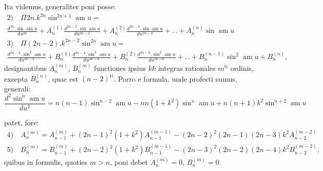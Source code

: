 \documentclass{article}
\begin{document}
Ita videmus, generaliter poni posse:
\[
\begin{gathered}
\text{2)}\quad\Pi 2n.k^{2n}\sin^{2n+1}\operatorname{am}u=\\[1.5ex]
\frac{d^{2n}.\sin\operatorname{am}u}{du^{2n}}+A_{n}^{(1)}\frac{d^{2n-2}.\sin\operatorname{am}u}{du^{2n-2}}+A_{n}^{(2)}\frac{d^{2n-4}.\sin\operatorname{am}u}{du^{2n-4}}+.\,.+A_{n}^{(n)}\sin\operatorname{am}u\\[1.5ex]
\text{3)}\quad\Pi(2n-2).k^{2n-2}\sin^{2n}\operatorname{am}u=\\[1.5ex]
\frac{d^{2n-2}.\sin^{2}\operatorname{am}u}{du^{2n-2}}+B_{n}^{(1)}\frac{d^{2n-4}.\sin^{2}\operatorname{am}u}{du^{2n-4}}+B_{n}^{(2)}\frac{d^{2n-6}.\sin^{2}\operatorname{am}u}{du^{2n-6}}+.\,.+B_{n}^{(n-1)}\sin^{2}\operatorname{am}u+B_{n}^{(n)},
\end{gathered}
\]
designantibus $A_{n}^{(m)}$, $B_{n}^{(m)}$ functiones ipsius $kk$ integras rationales $m^{\mathrm{ti}}$ ordinis, excepta $B_{n}^{(n)}$, quae est $(n-2)^{\mathrm{ti}}$. Porro e formula, unde profecti sumus, generali:
\[
\frac{d^{2}\sin^{n}\operatorname{am}u}{du^{2}}=n(n-1)\sin^{n-2}\operatorname{am}u-nn(1+k^{2})\sin^{n}\operatorname{am}u+n(n+1)k^{2}\sin^{n+2}\operatorname{am}u
\]

patet, fore:
\[
\begin{gathered}
\text{4)}\quad A_{n}^{(m)}=A_{n-1}^{(m)}+(2n-1)^{2}(1+k^{2})A_{n-1}^{(m-1)}-(2n-2)^{2}(2n-1)(2n-3)k^{2}A_{n-2}^{(m-2)}\\[1.5ex]
\text{5)}\quad B_{n}^{(m)}=B_{n-1}^{(m)}+(2n-2)^{2}(1+k^{2})B_{n-1}^{(m-1)}-(2n-3)^{2}(2n-2)(2n-4)k^{2}B_{n-2}^{(m-2)},
\end{gathered}
\]
quibus in formulis, quoties $m>n$, poni debet $A_{n}^{(m)}=0$, $B_{n}^{(m)}=0$.
\end{document}
